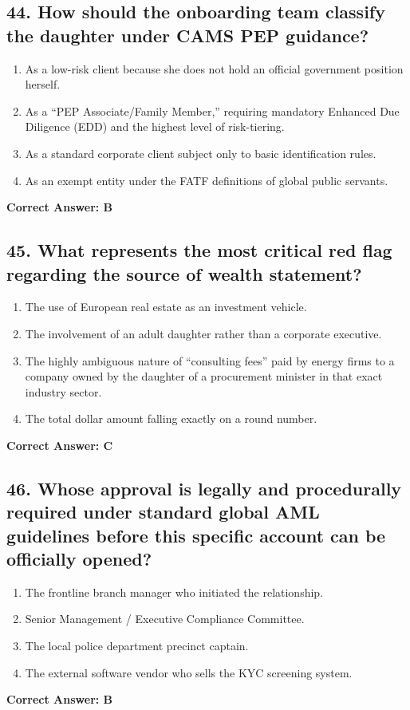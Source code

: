 \documentclass[11pt,a4paper]{article}
\begin{document}
	\subsection{44. How should the onboarding team classify the daughter under CAMS PEP guidance?}
	\begin{enumerate}[label=\Alph*.]
		\item As a low-risk client because she does not hold an official government position herself.
		\item As a ``PEP Associate/Family Member,'' requiring mandatory Enhanced Due Diligence (EDD) and the highest level of risk-tiering.
		\item As a standard corporate client subject only to basic identification rules.
		\item As an exempt entity under the FATF definitions of global public servants.
	\end{enumerate}
	\textbf{Correct Answer: B}
	
	\subsection{45. What represents the most critical red flag regarding the source of wealth statement?}
	\begin{enumerate}[label=\Alph*.]
		\item The use of European real estate as an investment vehicle.
		\item The involvement of an adult daughter rather than a corporate executive.
		\item The highly ambiguous nature of ``consulting fees'' paid by energy firms to a company owned by the daughter of a procurement minister in that exact industry sector.
		\item The total dollar amount falling exactly on a round number.
	\end{enumerate}
	\textbf{Correct Answer: C}
	
	\subsection{46. Whose approval is legally and procedurally required under standard global AML guidelines before this specific account can be officially opened?}
	\begin{enumerate}[label=\Alph*.]
		\item The frontline branch manager who initiated the relationship.
		\item Senior Management / Executive Compliance Committee.
		\item The local police department precinct captain.
		\item The external software vendor who sells the KYC screening system.
	\end{enumerate}
	\textbf{Correct Answer: B}
	
\end{document}

